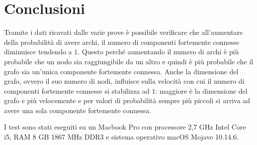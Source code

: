 \documentclass[11pt]{article}
\begin{document}
\section{Conclusioni}
Tramite i dati ricavati dalle varie prove è possibile verificare che all'aumentare della probabilità di avere archi, il numero di componenti fortemente connesse diminuisce tendendo a $1$. Questo perché aumentando il numero di archi è più probabile che un nodo sia raggiungibile da un altro e quindi è più probabile che il grafo sia un'unica componente fortemente connessa. Anche la dimensione del grafo, ovvero il suo numero di nodi, influisce sulla velocità con cui il numero di componenti fortemente connesse si stabilizza ad $1$: maggiore è la dimensione del grafo e più velocemente e per valori di probabilità sempre più piccoli si arriva ad avere una sola componente fortemente connessa.

I test sono stati eseguiti su un Macbook Pro con processore 2,7 GHz Intel Core i5, RAM 8 GB 1867 MHz DDR3 e sistema operativo macOS Mojave 10.14.6.
\end{document}
